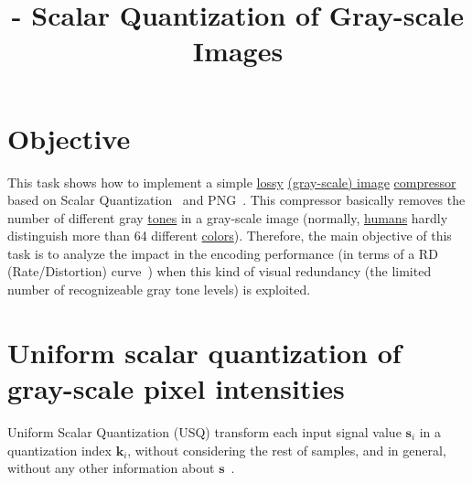 

\title{\SM{} - Scalar Quantization of Gray-scale Images}

\maketitle
\tableofcontents

\section{Objective}
This task shows how to implement a simple
\href{https://en.wikipedia.org/wiki/Lossy_compression}{lossy}
\href{https://en.wikipedia.org/wiki/Grayscale}{(gray-scale) image}
\href{https://en.wikipedia.org/wiki/Image_compression}{compressor}~\cite{vruiz__image_IO}
based on Scalar
Quantization~\cite{vruiz__scalar_quantization,sayood2017introduction,vetterli2014foundations}
and PNG~\cite{vruiz__PNG}. This compressor basically removes the
number of different gray
\href{https://en.wikipedia.org/w/index.php?title=Tone_(color)&redirect=no}{tones}
in a gray-scale image (normally,
\href{https://en.wikipedia.org/wiki/Visual_system}{humans} hardly
distinguish more than 64 different
\href{https://en.wikipedia.org/wiki/Color}{colors}). Therefore, the
main objective of this task is to analyze the impact in the encoding
performance (in terms of a RD (Rate/Distortion)
curve~\cite{vruiz__information_theory}) when this kind of visual
redundancy (the limited number of recognizeable gray tone levels) is
exploited.

\section{Uniform scalar quantization of gray-scale pixel intensities}
Uniform Scalar Quantization (USQ) transform each input signal value
$\mathbf{s}_i$ in a quantization index $\mathbf{k}_i$, without
considering the rest of samples, and in general, without any other
information about $\mathbf{s}$~\cite{vruiz__scalar_quantization}.

